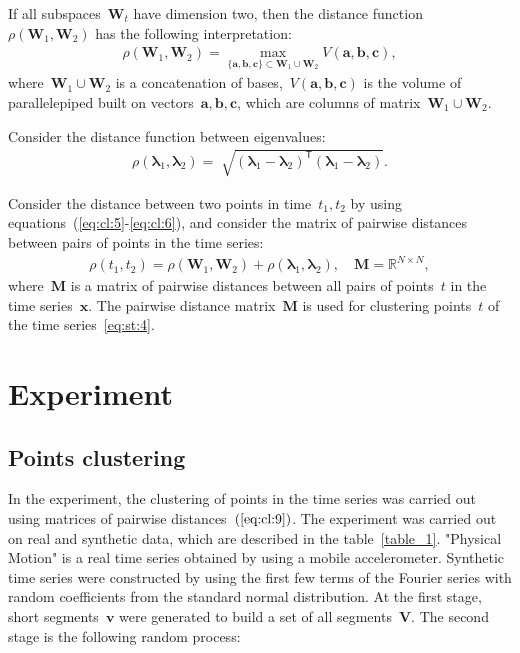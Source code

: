 \documentclass[12pt, twoside]{article}
\numberwithin{equation}{section}
\begin{document}
If all subspaces~$\textbf{W}_t$ have dimension two, then the distance function~$\rho\left(\textbf{W}_1, \textbf{W}_2\right)$ has the following interpretation:
\begin{equation}
\label{eq:cl:5}
\begin{aligned}
\rho\left(\textbf{W}_1, \textbf{W}_2\right) = \max_{\{\textbf{a},\textbf{b},\textbf{c}\} \subset \textbf{W}_1\cup \textbf{W}_2 } V\left(\textbf{a},\textbf{b},\textbf{c}\right), 
\end{aligned}
\end{equation}
where~$\textbf{W}_1\cup\textbf{W}_2$ is a concatenation of bases,~$V\left(\textbf{a},\textbf{b},\textbf{c}\right)$ is the volume of parallelepiped built on vectors~$\textbf{a}, \textbf{b}, \textbf{c}$, which are columns of matrix~$\textbf{W}_1\cup\textbf{W}_2$.

Consider the distance function between eigenvalues:
\begin{equation}
\label{eq:cl:6}
\begin{aligned}
\rho\left(\bm{\lambda}_1, \bm{\lambda}_2\right) = \sqrt[]{\left(\bm{\lambda}_1 - \bm{\lambda}_2\right)^{\mathsf{T}}\left(\bm{\lambda}_1 - \bm{\lambda}_2\right)}.
\end{aligned}
\end{equation}

Consider the distance between two points in time~$t_1, t_2$ by using equations~(\ref{eq:cl:5}-\ref{eq:cl:6}), and consider the matrix of pairwise distances between pairs of points in the time series:
\begin{equation}
\label{eq:cl:9}
\begin{aligned}
\rho\left(t_1, t_2\right) = \rho\left(\textbf{W}_1, \textbf{W}_2\right) + \rho\left(\bm{\lambda}_1, \bm{\lambda}_2\right), \quad \textbf{M} =  \mathbb{R}^{N\times N},
\end{aligned}
\end{equation}
where~$\textbf{M}$ is a matrix of pairwise distances between all pairs of points~$t$ in the time series~$\textbf{x}$.
The pairwise distance matrix~$\textbf{M}$ is used for clustering points~$t$ of the time series~\eqref{eq:st:4}.

\section{Experiment}
\subsection{Points clustering}
In the experiment, the clustering of points in the time series was carried out using matrices of pairwise distances~$(\ref{eq:cl:9})$. 
The experiment was carried out on real and synthetic data, which are described in the table~\ref{table_1}. 
"Physical Motion" is a real time series obtained by using a mobile accelerometer. 
Synthetic time series were constructed by using the first few terms of the Fourier series with random coefficients from the standard normal distribution.
At the first stage, short segments~$\textbf{v}$ were generated to build a set of all segments~$\mathbf{V}$.
The second stage is the following random process:
\end{document}
